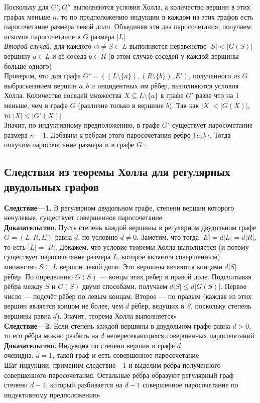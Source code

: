 \documentclass[a4paper]{article}
\newcommand{\qed}{\hfill$\square$}
\begin{document}
\indent Поскольку для $G', G''$ выполняются условия Холла, а количество вершин в этих графах меньше $n$, то по предположению индукции в каждом из этих графов есть паросочетание размера левой доли. Объединяя эти два паросочетания, получаем искомое паросочетание в $G$ размера $|L|$\\[2mm]
\indent \textit{Второй случай:} для каждого $\varnothing \neq S \subset L$ выполняется неравенство $|S|<|G(S)|$\\[2mm]
 вершину $a \in L$ и её соседа $b \in R$ (в этом случае соседей у каждой вершины больше одного)\\[2mm]
\indent Проверим, что для графа $G'=\left((L \setminus\{a\}),(R \setminus\{b\}), E'\right)$, полученного из $G$ выбрасыванием вершин $a, b$ и инцидентных им рёбер, выполняются условия Холла. Количество соседей множества $X \subseteq L \setminus\{a\}$ в графе $G'$ разве что на 1 меньше, чем в графе $G$ (различие только в вершине $b$). Так как $|X|<|G(X)|$, то $|X| \leqslant\left|G'(X)\right|$\\[2mm]
\indent Значит, по индуктивному предположению, в графе $G'$ существует паросочетание размера $n-1$. Добавим к рёбрам этого паросочетания ребро $\{a, b\}$. Тогда получим паросочетание размера $n$ в графе $G$  \qed

\subsection{Следствия из теоремы Холла для регулярных двудольных графов}
\textbf{Следствие—1.} В регулярном двудольном графе, степени вершин которого ненулевые, существует совершенное паросочетание\\[2mm]
\indent\textbf{Доказательство.} Пусть степень каждой вершины в регулярном двудольном графе $G=(L, R, E)$ равна $d$, по условию $d \neq 0$. Заметим, что тогда $|E|=d|L|=d|R|$, то есть $|L|=|R|$. Докажем, что условие теоремы Холла выполняется (и потому существует паросочетание размера $L$, которое является совершенным)\\[2mm]
 множество $S \subseteq L$ вершин левой доли. Эти вершины являются концами $d|S|$ рёбер. По определнию $G(S)$ — концы этих ребер в правой доле. Подсчитывая рёбра между $S$ и $G(S)$ двумя способами, получаем $d|S| \leqslant d|G(S)|$. Первое число — подсчёт рёбер по левым концам. Второе — по правым (каждая из этих вершин является концом не более, чем $d$ рёбер, ведущих в $S$, поскольку степень вершины равна $d$). Значит, теорема Холла выполняется\qed\\[2mm]
\indent\textbf{Следствие—2.} Если степень каждой вершины в двудольном графе равна $d > 0,$ то его рёбра можно разбить на $d$ непересекающихся совершенных паросочетаний\\[2mm]
\indent\textbf{Доказательство.} Индукция по степени вершин в графе $d$\\[2mm]
 очевидна: $d=1$, такой граф и есть совершенное паросочетание\\[2mm]
\indent Шаг индукции: применим следствие—1 и выделим рёбра полученного совершенного паросочетания. Остальные рёбра образуют регулярный граф степени $d-1$, который разбивается на $d-1$ совершенное паросочетание по индуктивному предположению\qed
\end{document}
